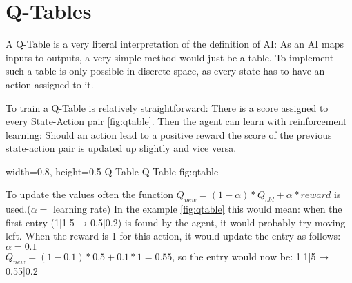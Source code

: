 \section{Q-Tables}
\label{sec:QTable}
A Q-Table is a very literal interpretation of the definition of AI: As an AI maps inputs to outputs, a very simple method would just be a table. To implement such a table is only possible in discrete space, as every state has to have an action assigned to it.

To train a Q-Table is relatively straightforward: There is a score assigned to every State-Action pair \autoref{fig:qtable}. Then the agent can learn with reinforcement learning: Should an action lead to a positive reward the score of the previous state-action pair is updated up slightly and vice versa.

    {width=0.8\textwidth, height=0.5\textheight} %
    {Q-Table}   %
    {Q-Table}   %
    {fig:qtable}    %

To update the values often the function $Q_{new}=(1-\alpha)*Q_{old}+\alpha*reward$ is used.($\alpha=$ learning rate)
In the example \autoref{fig:qtable} this would mean: when the first entry (1|1|5 → 0.5|0.2) is found by the agent, it would probably try moving left. When the reward is 1 for this action, it would update the entry as follows: $\alpha=0.1$\\$Q_{new}=(1-0.1)*0.5+0.1*1=0.55$, so the entry would now be: 1|1|5 → 0.55|0.2

